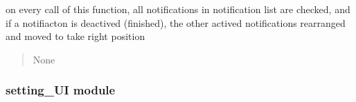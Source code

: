 \documentclass[letterpaper,10pt,english]{sphinxmanual}
\begin{document}

\begin{savenotes}\begin{fulllineitems}
\label{\detokenize{setting/notif_UI:oxin.notif_UI.rearange_active_notifes}}
\pysigstartsignatures
{}
\pysigstopsignatures
\sphinxAtStartPar
on every call of this function, all notifications in notification list are checked, and if a notifiacton is deactived (finished),
the other actived notifications rearranged and moved to take right position
\begin{quote}\begin{description}
\sphinxAtStartPar
None

\end{description}\end{quote}

\end{fulllineitems}\end{savenotes}


\sphinxstepscope


\subsubsection{setting\_UI module}
\label{\detokenize{setting/setting_UI:module-oxin.setting_UI}}\label{\detokenize{setting/setting_UI:setting-ui-module}}\label{\detokenize{setting/setting_UI::doc}}
\end{document}
